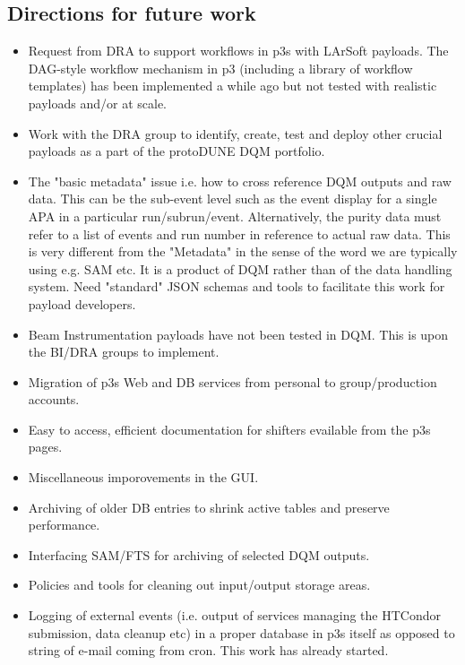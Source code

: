 \documentclass[pdftex,12pt,letter]{article}
\newcommand{\pd}{protoDUNE\xspace}
\begin{document}
 
\subsection{Directions for future work}

\begin{itemize}

\item Request from DRA to support workflows in p3s with LArSoft payloads. The DAG-style workflow mechanism in p3
(including a library of workflow templates) has been implemented a while ago but not tested with realistic payloads and/or at scale.

\item Work with the DRA group to identify, create, test and deploy other crucial payloads as a part of the \pd DQM portfolio.

\item The "basic metadata" issue i.e. how to cross reference DQM outputs and raw data. This can be the sub-event level such as the event
display for a single APA in a particular run/subrun/event. Alternatively, the purity data must refer to a list of events and run number in reference
to actual raw data. This is very different from the "Metadata" in the sense of the word we are typically using e.g. SAM etc.
It is a product of DQM rather than of the data handling system. Need "standard" JSON schemas and tools to facilitate this work for payload developers.

\item Beam Instrumentation payloads have not been tested in DQM. This is upon the BI/DRA groups to implement.

\item Migration of p3s Web and DB services from personal to group/production accounts.

\item Easy to access, efficient documentation for shifters evailable from the p3s pages.

\item Miscellaneous imporovements in the GUI.

\item Archiving of older DB entries to shrink active tables and preserve performance.

\item Interfacing SAM/FTS for archiving of selected DQM outputs.

\item Policies and tools for cleaning out input/output storage areas.

\item Logging of external events (i.e. output of services managing the HTCondor submission, data cleanup etc) in a proper database
in p3s itself as opposed to string of e-mail coming from cron. This work has already started.

\end{itemize}
\end{document}
